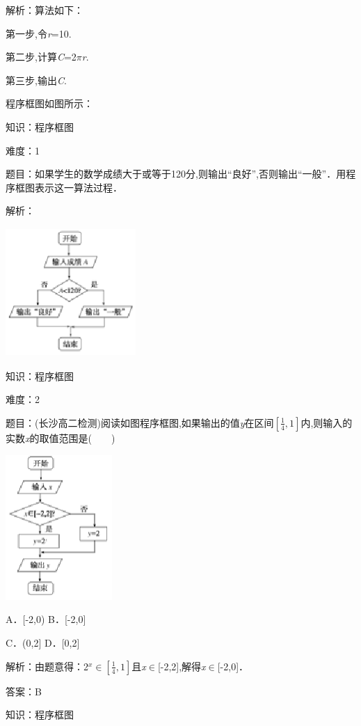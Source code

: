 \documentclass{article} %
\begin{document}
解析：算法如下：

第一步,令\textit{r}=10.

第二步,计算\textit{C}=2$\pi$\textit{r}.

第三步,输出\textit{C}.

程序框图如图所示：

知识：程序框图

难度：1

题目：如果学生的数学成绩大于或等于120分,则输出``良好'',否则输出``一般''．用程序框图表示这一算法过程．

解析：


{\bf \includegraphics*[width=1.95in, height=1.93in, keepaspectratio=false]{image10}}



知识：程序框图

难度：2

题目：(长沙高二检测)阅读如图程序框图,如果输出的值\textit{y}在区间$[\frac{1}{4},1]$内,则输入的实数\textit{x}的取值范围是(　　)

\includegraphics*[width=1.59in, height=2.17in, keepaspectratio=false]{image11}

A．[-2,0)     B．[-2,0]

C．(0,2]      D．[0,2]

解析：由题意得：2\textit{${}^{x}$}$\mathrm{\in}$$[\frac{1}{4},1]$且\textit{x}$\mathrm{\in}$[-2,2],解得\textit{x}$\mathrm{\in}$[-2,0]．

答案：B

知识：程序框图
\end{document}
